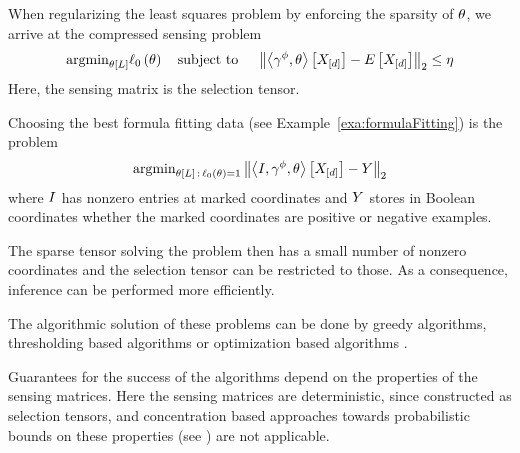 When regularizing the least squares problem by enforcing the sparsity of $\theta$, we arrive at the compressed sensing problem
\begin{align}
	\mathrm{argmin}_{\theta\left[L\right]} \ell_0\left(\theta\right) 
	\quad \text{subject to } \quad 
	\left\| \left\langle \gamma^{\phi},\theta\right\rangle \left[ X_{[d]} \right] - E\left[X_{[d]}\right] \right\|_2 \leq \eta
\end{align}
Here, the sensing matrix is the selection tensor.


\begin{example}
	Choosing the best formula fitting data (see Example~\ref{exa:formulaFitting}) is the problem
	\begin{align}
	\mathrm{argmin}_{\theta\left[L\right]\, : \,  \ell_0\left(\theta\right)=1} \left\| \left\langle I,\gamma^{\phi},\theta\right\rangle \left[ X_{[d]} \right] - Y \right\|_2 
	\end{align}
	where $I$ has nonzero entries at marked coordinates and $Y$ stores in Boolean coordinates whether the marked coordinates are positive or negative examples.
\end{example}

The sparse tensor solving the problem then has a small number of nonzero coordinates and the selection tensor can be restricted to those.
As a consequence, inference can be performed more efficiently.

The algorithmic solution of these problems can be done by greedy algorithms, thresholding based algorithms or optimization based algorithms \cite{foucart_mathematical_2013}.

Guarantees for the success of the algorithms depend on the properties of the sensing matrices.
Here the sensing matrices are deterministic, since constructed as selection tensors, and concentration based approaches towards probabilistic bounds on these properties (see \cite{goesmann_uniform_2021}) are not applicable.





